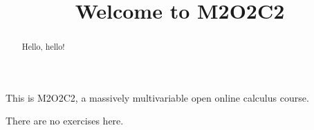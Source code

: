 \documentclass{ximera}
\title{Welcome to M2O2C2}
\begin{document}
\begin{abstract}
  Hello, hello!
\end{abstract}

This is M2O2C2, a massively multivariable open online calculus course.

There are no exercises here.
\end{document}
